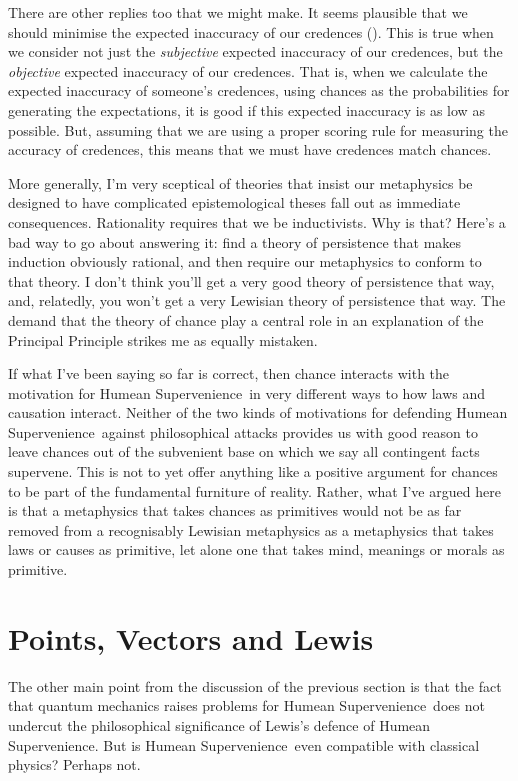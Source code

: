 \documentclass[
  11pt,
  letterpaper,
  DIV=11,
  numbers=noendperiod,
  twoside]{scrartcl}
\begin{document}
There are other replies too that we might make. It seems plausible that
we should minimise the expected inaccuracy of our credences
(). This is true when we consider
not just the \emph{subjective} expected inaccuracy of our credences, but
the \emph{objective} expected inaccuracy of our credences. That is, when
we calculate the expected inaccuracy of someone's credences, using
chances as the probabilities for generating the expectations, it is good
if this expected inaccuracy is as low as possible. But, assuming that we
are using a proper scoring rule for measuring the accuracy of credences,
this means that we must have credences match chances.

More generally, I'm very sceptical of theories that insist our
metaphysics be designed to have complicated epistemological theses fall
out as immediate consequences. Rationality requires that we be
inductivists. Why is that? Here's a bad way to go about answering it:
find a theory of persistence that makes induction obviously rational,
and then require our metaphysics to conform to that theory. I don't
think you'll get a very good theory of persistence that way, and,
relatedly, you won't get a very Lewisian theory of persistence that way.
The demand that the theory of chance play a central role in an
explanation of the Principal Principle strikes me as equally mistaken.

If what I've been saying so far is correct, then chance interacts with
the motivation for Humean Supervenience~in very different ways to how
laws and causation interact. Neither of the two kinds of motivations for
defending Humean Supervenience~against philosophical attacks provides us
with good reason to leave chances out of the subvenient base on which we
say all contingent facts supervene. This is not to yet offer anything
like a positive argument for chances to be part of the fundamental
furniture of reality. Rather, what I've argued here is that a
metaphysics that takes chances as primitives would not be as far removed
from a recognisably Lewisian metaphysics as a metaphysics that takes
laws or causes as primitive, let alone one that takes mind, meanings or
morals as primitive.

\section{Points, Vectors and Lewis}\label{points-vectors-and-lewis}

The other main point from the discussion of the previous section is that
the fact that quantum mechanics raises problems for Humean
Supervenience~does not undercut the philosophical significance of
Lewis's defence of Humean Supervenience. But is Humean
Supervenience~even compatible with classical physics? Perhaps not.
\end{document}
